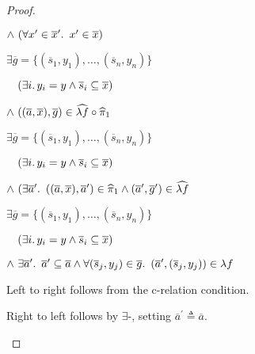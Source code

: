 \begin{prop}
\begin{proof}
\begin{itemize}
      \step
        \quad$\land~(\forall x^\prime\in\overline{x}^\prime\ldotp~x^\prime\in\overline{x})$
      \addtolength{\itemsep}{.3\baselineskip}

      \step[\iffs]
        $\exists\overline{g} = \{(\overline{s}_1,y_1),\ldots,(\overline{s}_n,y_n)\}$

      \addtolength{\itemsep}{-.3\baselineskip}
      \step
        \quad$\phantom{\land}~(\exists i\ldotp y_i=y\land\overline{s}_i\subseteq\overline{x})$

      \step
        \quad$\land~((\overline{a},\overline{x}), \overline{g})\in\widehat{\lambda f}\circ\widehat{\pi}_1$
        \marginnote{\Thm-\ref{prop:rel-hat-comp}}

      \addtolength{\itemsep}{.3\baselineskip}

      \step[\iffs]
        $\exists\overline{g} = \{(\overline{s}_1,y_1),\ldots,(\overline{s}_n,y_n)\}$

      \addtolength{\itemsep}{-.3\baselineskip}
      \step
        \quad$\phantom{\land}~(\exists i\ldotp y_i=y\land\overline{s}_i\subseteq\overline{x})$

      \step
        \quad$\land~(\exists\overline{a}^\prime\ldotp~((\overline{a},\overline{x}),\overline{a}^\prime)\in\widehat{\pi}_1\land(\overline{a}^\prime,\overline{g}^\prime)\in\widehat{\lambda f}$

      \addtolength{\itemsep}{.3\baselineskip}

      \step[\iffs]
        $\exists\overline{g} = \{(\overline{s}_1,y_1),\ldots,(\overline{s}_n,y_n)\}$

      \addtolength{\itemsep}{-.3\baselineskip}
      \step
        \quad$\phantom{\land}~(\exists i\ldotp y_i=y\land\overline{s}_i\subseteq\overline{x})$

      \step
        \quad$\land~\exists\overline{a}^\prime\ldotp~\overline{a}^\prime\subseteq\overline{a}\land\forall(\overline{s}_j,y_j)\in\overline{g}\ldotp~(\overline{a}^\prime,(\overline{s}_j, y_j))\in\lambda f$

      \addtolength{\itemsep}{.3\baselineskip}

      \step
        Left to right follows from the c-relation condition.

      \step
        Right to left follows by $\exists$-\Intro, setting $\overline{a}^\prime\triangleq\overline{a}$.


\end{itemize}
\end{proof}
\end{prop}
